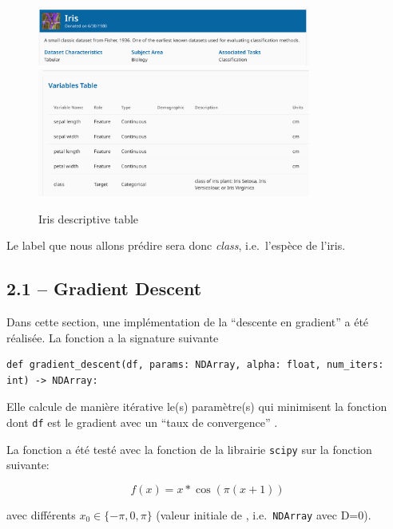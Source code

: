 \documentclass[
]{article}
\begin{document}
\begin{figure}
\centering
\includegraphics[width=0.8\textwidth,height=\textheight]{../res/iris_img.png}
\includegraphics[width=0.8\textwidth,height=\textheight]{../res/iris_table.png}
\caption{Iris descriptive table}
\end{figure}

Le label que nous allons prédire sera donc \emph{class}, i.e.~l'espèce
de l'iris.

\newpage

\subsection{2.1 -- Gradient Descent}\label{gradient-descent}

Dans cette section, une implémentation de la ``descente en gradient'' a
été réalisée. La fonction a la signature suivante

\begin{lstlisting}
def gradient_descent(df, params: NDArray, alpha: float, num_iters: int) -> NDArray:  
\end{lstlisting}

Elle calcule de manière itérative le(s) paramètre(s)  qui
minimisent la fonction dont \texttt{df} est le gradient avec un ``taux
de convergence'' .

La fonction a été testé avec la fonction 
\cite{ScipyOptimizeFmin} de la librairie \texttt{scipy} sur la fonction
suivante:

\[
f(x) = x * \cos(\pi  (x + 1))
\]

avec différents \(x_0 \in \{-\pi, 0, \pi\}\) (valeur initiale de
, i.e.~\texttt{NDArray} avec D=0).
\end{document}
